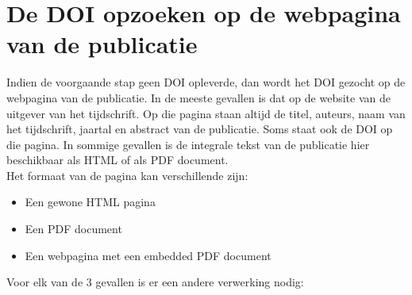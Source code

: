 \section{De DOI opzoeken op de webpagina van de publicatie}
Indien de voorgaande stap geen DOI opleverde, dan wordt het DOI gezocht op de webpagina van de publicatie. In de meeste gevallen is dat op de website van de uitgever van het tijdschrift. Op die pagina staan altijd de titel, auteurs, naam van het tijdschrift, jaartal en abstract van de publicatie.
Soms staat ook de DOI op die pagina.
In sommige gevallen is de integrale tekst van de publicatie hier beschikbaar als HTML of als PDF document.\\
Het formaat van de pagina kan verschillende zijn:
\begin{itemize}
    \item Een gewone HTML pagina
    \item Een PDF document
    \item Een webpagina met een embedded PDF document
\end{itemize}
Voor elk van de 3 gevallen is er een andere verwerking nodig:
